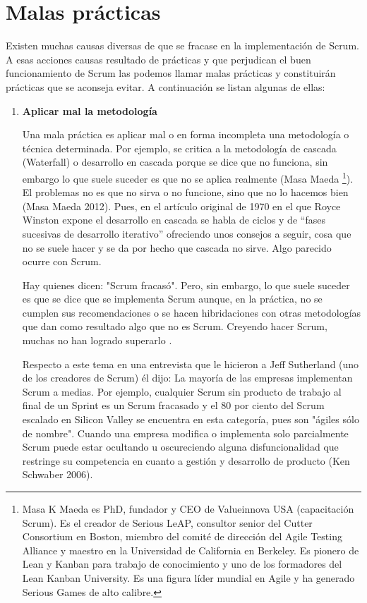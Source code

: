 
\chapter{Malas prácticas}

Existen muchas causas diversas de que se fracase en la implementación de Scrum. A esas acciones causas resultado de prácticas y que perjudican el buen funcionamiento de Scrum las podemos llamar malas prácticas y constituirán prácticas que se aconseja evitar.
A continuación se listan algunas de ellas:

\begin{enumerate}

\item \textbf{Aplicar mal la metodología}

Una mala práctica es aplicar mal o en forma incompleta una metodología o técnica determinada. Por ejemplo, se critica a la metodología de cascada (Waterfall) o desarrollo en cascada porque se dice que no funciona, sin embargo lo que suele suceder es que no se aplica realmente (Masa Maeda \footnote{Masa K Maeda es PhD, fundador y CEO de Valueinnova USA (capacitación Scrum). Es el creador de Serious LeAP, consultor senior del Cutter Consortium en Boston, miembro del comité de dirección del Agile Testing Alliance y maestro en la Universidad de California en Berkeley. Es pionero de Lean y Kanban para trabajo de conocimiento y uno de los formadores del Lean Kanban University. Es una figura líder mundial en Agile y ha generado Serious Games de alto calibre.}). El problemas no es que no sirva o no funcione, sino que no lo hacemos bien (Masa Maeda  2012). Pues, en el artículo original de 1970 en el que Royce Winston expone el desarrollo en cascada se habla de ciclos y de “fases sucesivas de desarrollo iterativo” \cite{Winston-Royce-1970} ofreciendo unos consejos a seguir, cosa que no se suele hacer y se da por hecho que cascada no sirve. Algo parecido ocurre con Scrum.

Hay quienes dicen:  "Scrum fracasó". Pero, sin embargo, lo que suele suceder es que se dice que se implementa Scrum aunque, en la práctica, no se cumplen sus recomendaciones o se hacen hibridaciones con otras metodologías que dan como resultado algo que no es Scrum. Creyendo hacer Scrum, muchas no han logrado superarlo \cite{Gantthead-James-2010}.  

Respecto a este tema en una entrevista que le hicieron a Jeff Sutherland (uno de los creadores de Scrum) él dijo: La mayoría de las empresas implementan Scrum a medias. Por ejemplo, cualquier Scrum sin producto de trabajo al final de un Sprint es un Scrum fracasado y el 80 por ciento del Scrum escalado en Silicon Valley se encuentra en esta categoría, pues son "ágiles sólo de nombre". Cuando una empresa modifica o implementa solo parcialmente Scrum puede estar ocultando u oscureciendo alguna disfuncionalidad que restringe su competencia en cuanto a gestión y desarrollo de producto (Ken Schwaber 2006).



\end{enumerate}
